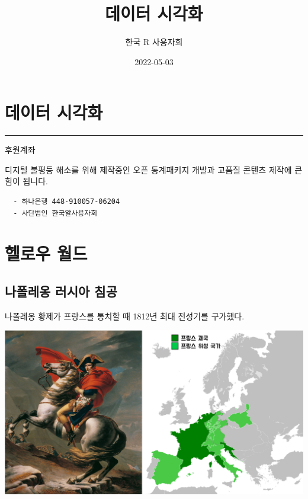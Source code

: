 \documentclass[
]{book}
\title{데이터 시각화}
\author{한국 R 사용자회}
\date{2022-05-03}
\begin{document}
\maketitle

{
\setcounter{tocdepth}{1}
\tableofcontents
}
\hypertarget{uxb370uxc774uxd130-uxc2dcuxac01uxd654}{%
\chapter*{데이터 시각화}\label{uxb370uxc774uxd130-uxc2dcuxac01uxd654}}

\begin{center}\rule{0.5\linewidth}{0.5pt}\end{center}

후원계좌

디지털 불평등 해소를 위해 제작중인 오픈 통계패키지 개발과 고품질 콘텐츠 제작에 큰 힘이 됩니다.

\begin{verbatim}
  - 하나은행 448-910057-06204
  - 사단법인 한국알사용자회
\end{verbatim}

\hypertarget{hello-world}{%
\chapter{헬로우 월드}\label{hello-world}}

\hypertarget{napoleon-invasion}{%
\section{나폴레옹 러시아 침공}\label{napoleon-invasion}}

나폴레옹 황제가 프랑스를 통치할 때 1812년 최대 전성기를 구가했다.

\includegraphics[width=1\textwidth,height=\textheight]{assets/images/about_napoleon.png}
\end{document}
